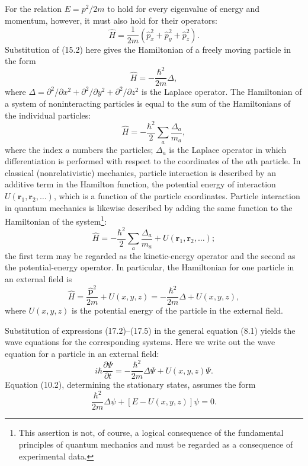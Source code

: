 For the relation $E=p^2/2m$ to hold for every eigenvalue of energy and
momentum, however, it must also hold for their operators:
\begin{equation}
  \hat H=\frac{1}{2m}\left(\hat p_x^2+\hat p_y^2+\hat p_z^2\right).
  \tag{17.1}
\end{equation}
Substitution of (15.2) here gives the Hamiltonian of a freely moving particle
in the form
\begin{equation}
  \hat H=-\frac{\hbar^2}{2m}\Delta,
  \tag{17.2}
\end{equation}
where $\Delta=\partial^2/\partial x^2+\partial^2/\partial y^2+
\partial^2/\partial z^2$ is the Laplace operator. The Hamiltonian of a system
of noninteracting particles is equal to the sum of the Hamiltonians of the
individual particles:
\begin{equation}
  \hat H=-\frac{\hbar^2}{2}\sum_a\frac{\Delta_a}{m_a},
  \tag{17.3}
\end{equation}
where the index $a$ numbers the particles; $\Delta_a$ is the Laplace operator
in which differentiation is performed with respect to the coordinates of the
$a$th particle.
In classical (nonrelativistic) mechanics, particle interaction is described by
an additive term in the Hamilton function, the potential energy of interaction
$U(\mathbf r_1,\mathbf r_2,\ldots)$, which is a function of the particle
coordinates. Particle interaction in quantum mechanics is likewise described
by adding the same function to the Hamiltonian of the
system\footnote{This assertion is not, of course, a logical consequence of the
fundamental principles of quantum mechanics and must be regarded as a
consequence of experimental data.}:
\begin{equation}
  \hat H=-\frac{\hbar^2}{2}\sum_a\frac{\Delta_a}{m_a}
  +U(\mathbf r_1,\mathbf r_2,\ldots);
  \tag{17.4}
\end{equation}
the first term may be regarded as the kinetic-energy operator and the second
as the potential-energy operator. In particular, the Hamiltonian for one
particle in an external field is
\begin{equation}
  \hat H=\frac{\hat{\mathbf p}^{2}}{2m}+U(x,y,z)
  =-\frac{\hbar^2}{2m}\Delta+U(x,y,z),
  \tag{17.5}
\end{equation}
where $U(x,y,z)$ is the potential energy of the particle in the external
field.

Substitution of expressions (17.2)--(17.5) in the general equation (8.1)
yields the wave equations for the corresponding systems. Here we write out
the wave equation for a particle in an external field:
\begin{equation}
  i\hbar\frac{\partial\Psi}{\partial t}
  =-\frac{\hbar^2}{2m}\Delta\Psi+U(x,y,z)\Psi.
  \tag{17.6}
\end{equation}
Equation (10.2), determining the stationary states, assumes the form
\begin{equation}
  \frac{\hbar^2}{2m}\Delta\psi+[E-U(x,y,z)]\psi=0.
  \tag{17.7}
\end{equation}

